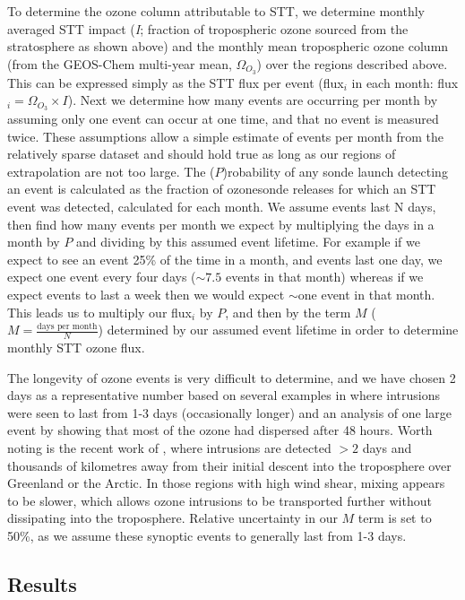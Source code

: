     To determine the ozone column attributable to STT, we determine monthly averaged STT impact (\textit{I}; fraction of tropospheric ozone sourced from the stratosphere as shown above) and the monthly mean tropospheric ozone column (from the GEOS-Chem multi-year mean, $\Omega_{O_3}$) over the regions described above.
    This can be expressed simply as the STT flux per event (flux$_i$ in each month: flux$_i = \Omega_{O_3} \times I$).
    Next we determine how many events are occurring per month by assuming only one event can occur at one time, and that no event is measured twice.
    These assumptions allow a simple estimate of events per month from the relatively sparse dataset and should hold true as long as our regions of extrapolation are not too large.
    The ($P$)robability of any sonde launch detecting an event is calculated as the fraction of ozonesonde releases for which an STT event was detected, calculated for each month.
    We assume events last N days, then find how many events per month we expect by multiplying the days in a month by $P$ and dividing by this assumed event lifetime.
    For example if we expect to see an event 25\% of the time in a month, and events last one day, we expect one event every four days ($\sim 7.5$ events in that month) whereas if we expect events to last a week then we would expect $\sim$one event in that month.
    This leads us to multiply our flux$_i$ by $P$, and then by the term $M$ ($M= \frac{\text{days per month}}{N}$) determined by our assumed event lifetime in order to determine monthly STT ozone flux.
    
    The longevity of ozone events is very difficult to determine, and we have chosen 2 days as a representative number based on several examples in \cite{Lin2012} where intrusions were seen to last from 1-3 days (occasionally longer) and an analysis of one large event by \cite{Cooper2004} showing that most of the ozone had dispersed after 48 hours.
    Worth noting is the recent work of \cite{Trickl2014}, where intrusions are detected $>2$ days and thousands of kilometres away from their initial descent into the troposphere over Greenland or the Arctic.
    In those regions with high wind shear, mixing appears to be slower, which allows ozone intrusions to be transported further without dissipating into the troposphere.
    Relative uncertainty in our $M$ term is set to 50\%, as we assume these synoptic events to generally last from 1-3 days.
  
  \subsection{Results}
    
